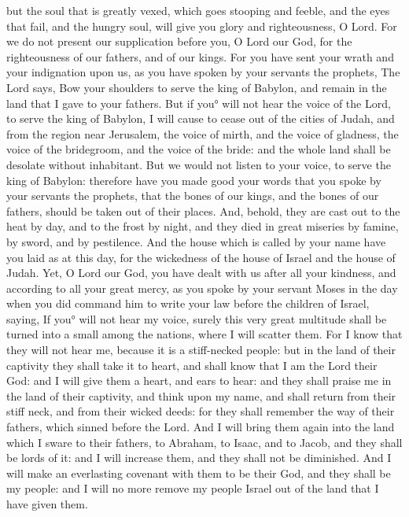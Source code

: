 {but the soul that is greatly vexed, which goes stooping and feeble, and the eyes that fail, and the hungry soul, will give you glory and righteousness, O Lord.
For we do not present our supplication before you, O Lord our God, for the righteousness of our fathers, and of our kings.
For you have sent your wrath and your indignation upon us, as you have spoken by your servants the prophets,
{}
The Lord says, Bow your shoulders to serve the king of Babylon, and remain in the land that I gave to your fathers.
But if you° will not hear the voice of the Lord, to serve the king of Babylon,
I will cause to cease out of the cities of Judah, and from the region near Jerusalem, the voice of mirth, and the voice of gladness, the voice of the bridegroom, and the voice of the bride: and the whole land shall be desolate without inhabitant.
But we would not listen to your voice, to serve the king of Babylon: therefore have you made good your words that you spoke by your servants the prophets,
{} that the bones of our kings, and the bones of our fathers, should be taken out of their places.
And, behold, they are cast out to the heat by day, and to the frost by night, and they died in great miseries by famine, by sword, and by
 pestilence.
And the house which is called by your name have you laid
{} as at this day, for the wickedness of the house of Israel and the house of Judah.
Yet, O Lord our God, you have dealt with us after all your kindness, and according to all your great mercy,
as you spoke by your servant Moses in the day when you did command him to write your law before the children of Israel, saying,
If you° will not hear my voice, surely this very great multitude shall be turned into a small
{} among the nations, where I will scatter them.
For I know that they will not hear me, because it is a stiff-necked people: but in the land of their captivity they shall take it to heart,
and shall know that I am the Lord their God: and I will give them a heart, and ears to hear:
and they shall praise me in the land of their captivity, and think upon my name,
and shall return from their stiff neck, and from their wicked deeds: for they shall remember the way of their fathers, which sinned before the Lord.
And I will bring them again into the land which I sware to their fathers, to Abraham, to Isaac, and to Jacob, and they shall be lords of it: and I will increase them, and they shall not be diminished.
And I will make an everlasting covenant with them to be their God, and they shall be my people: and I will no more remove my people Israel out of the land that I have given them.

}
